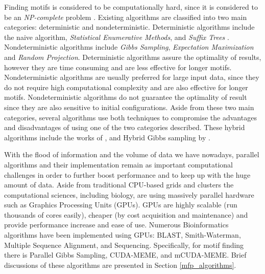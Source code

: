 \documentclass{llncs}
\begin{document}
Finding motifs is considered to be computationally hard, since it is considered to be an \textit{NP-complete} problem \cite{pevznerBook}. Existing algorithms are classified into two main categories: deterministic and nondeterministic\cite{yu}. Deterministic algorithms include the naive algorithm\cite{pevznerBook}, \textit{Statistical Enumerative Methods}, and \textit{Suffix Trees} \cite{pevznerBook}. Nondeterministic algorithms include \textit{Gibbs Sampling}\cite{yu}, \textit{Expectation Maximization}\cite{lawrenceEM} and \textit{Random Projection}\cite{tompa}. Deterministic algorithms assure the optimality of results,  however they are time consuming and are less effective for longer motifs. Nondeterministic algorithms are usually preferred for large input data,  since they do not require high computational complexity and are also effective for longer motifs. Nondeterministic algorithms do not guarantee the optimality of result since they are also sensitive to initial configurations. Aside from these two main categories, several algorithms use both techniques to compromise the advantages and disadvantages of using one of the two categories described. These hybrid algorithms include the works of \cite{shashidhara}, and Hybrid Gibbs sampling by \cite{hybridGibbs}.

With the flood of information and the volume of data we have nowadays, parallel algorithms and their implementation remain as important computational challenges in order to further boost performance and to keep up with the huge amount of data. Aside from traditional CPU-based grids and clusters the computational sciences, including biology, are using massively parallel hardware such as Graphics Processing Units (GPUs). GPUs are highly scalable (run thousands of cores easily), cheaper (by cost acquisition and maintenance) and provide performance increase and ease of use. Numerous Bioinformatics algorithms have been implemented using GPUs: BLAST, Smith-Waterman, Multiple Sequence Alignment, and Sequencing. Specifically, for motif finding there is Parallel Gibbs Sampling, CUDA-MEME\cite{liu}, and mCUDA-MEME\cite{liu}.  Brief discussions of these algorithms are presented in Section \ref{mfp_algorithms}.
\end{document}
